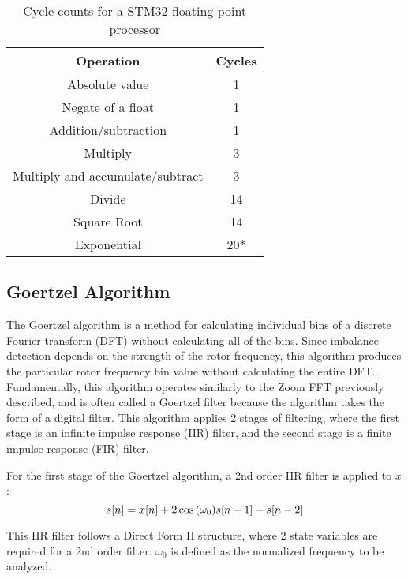 \begin{table}[]
\centering
\caption{Cycle counts for a STM32 floating-point processor}
\label{t:stm32_cycles}
\vspace*{0.2in}
\begin{tabular}{|c|c|}
\rowcolor[HTML]{EFEFEF} 
\hline
\textbf{Operation} & \textbf{Cycles} \\ \hline
Absolute value & 1 \\ \hline
Negate of a float & 1 \\ \hline
Addition/subtraction & 1 \\ \hline
Multiply & 3 \\ \hline
Multiply and accumulate/subtract & 3 \\ \hline
Divide & 14 \\ \hline
Square Root & 14 \\ \hline
Exponential & 20* \\ \hline
\end{tabular}
\end{table}



\subsection{Goertzel Algorithm}
The Goertzel algorithm is a method for calculating individual bins of a discrete Fourier transform (DFT) without calculating all of the bins.  Since imbalance detection depends on the strength of the rotor frequency, this algorithm produces the particular rotor frequency bin value without calculating the entire DFT.  Fundamentally, this algorithm operates similarly to the Zoom FFT previously described, and is often called a Goertzel filter because the algorithm takes the form of a digital filter.  This algorithm applies 2 stages of filtering, where the first stage is an infinite impulse response (IIR) filter, and the second stage is a finite impulse response (FIR) filter.

For the first stage of the Goertzel algorithm, a 2nd order IIR filter is applied to $x$:
\begin{equation}
	s[n] = x[n] + 2 \cos{(\omega_0)}s[n-1] - s[n-2] \\
\end{equation}

This IIR filter follows a Direct Form II structure, where 2 state variables are required for a 2nd order filter.  $\omega_0$ is defined as the normalized frequency to be analyzed.

